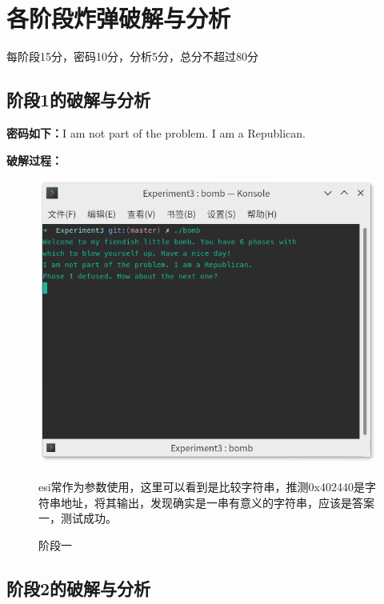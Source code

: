 \section{各阶段炸弹破解与分析}
\begin{center}
    每阶段15分，密码10分，分析5分，总分不超过80分
\end{center}

\subsection{阶段1的破解与分析}

\textbf{密码如下：}I am not part of the problem. I am a Republican.

\textbf{破解过程：}

\begin{figure}[H]
\begin{minipage}[l]{0.5\linewidth}
\centering
\includegraphics[width=\linewidth]{figures/Bomb-1}
\caption{阶段一}
\label{fig:bomb-1}
\end{minipage}
\begin{minipage}[r]{0.5\linewidth}
esi常作为参数使用，这里可以看到是比较字符串，推测0x402440是字符串地址，将其输出，发现确实是一串有意义的字符串，应该是答案一，测试成功。
\end{minipage}
\end{figure}


\subsection{阶段2的破解与分析}

